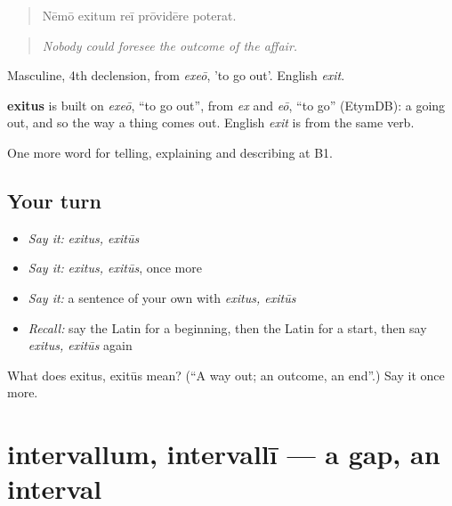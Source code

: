 \begin{quote}
Nēmō exitum reī prōvidēre poterat.
\end{quote}

\begin{quote}
\emph{Nobody could foresee the outcome of the affair.}
\end{quote}

Masculine, 4th declension, from \emph{exeō}, 'to go out'. English \emph{exit}.

\begin{cousinweb}
\textbf{exitus} is built on \emph{exeō}, \textquotedblleft{}to go out\textquotedblright{}, from \emph{ex} and \emph{eō}, \textquotedblleft{}to go\textquotedblright{} (EtymDB): a going out, and so the way a thing comes out. English \emph{exit} is from the same verb.
\end{cousinweb}

\begin{grammarlens}[title={What you've built}]
One more word for telling, explaining and describing at B1.
\end{grammarlens}

\subsection*{Your turn}
\begin{itemize}
\raggedright
  \item \emph{Say it:} \emph{exitus, exitūs}
  \item \emph{Say it:} \emph{exitus, exitūs}, once more
  \item \emph{Say it:} a sentence of your own with \emph{exitus, exitūs}
  \item \emph{Recall:} say the Latin for a beginning, then the Latin for a start, then say \emph{exitus, exitūs} again
\end{itemize}

\begin{tcolorbox}[breakable,colback=teal!4,colframe=teal!35!black,title={Before you move on}]
What does exitus, exitūs mean? (\textquotedblleft{}A way out; an outcome, an end\textquotedblright{}.) Say it once more.
\end{tcolorbox}
\section[intervallum, intervallī]{intervallum, intervallī — a gap, an interval}

\label{lesson:LA-C296-intervallum}



